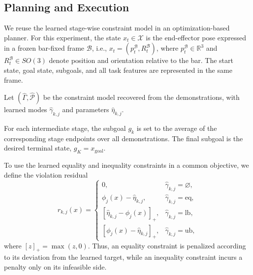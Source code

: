 

\subsection{Planning and Execution}

We reuse the learned stage-wise constraint model in an optimization-based planner. For this experiment, the state $x_t\in\mathcal{X}$ is the end-effector pose expressed in a frozen bar-fixed frame $\mathcal{B}$, i.e., $x_t=(p_t^{\mathcal{B}},R_t^{\mathcal{B}})$, where $p_t^{\mathcal{B}}\in\mathbb{R}^3$ and $R_t^{\mathcal{B}}\in SO(3)$ denote position and orientation relative to the bar. The start state, goal state, subgoals, and all task features are represented in the same frame.

Let $(\widehat{\Gamma},\widehat{\mathcal{P}})$ be the constraint model recovered from the demonstrations, with learned modes $\widehat{\gamma}_{k,j}$ and parameters $\widehat{\eta}_{k,j}$.

For each intermediate stage, the subgoal $g_k$ is set to the average of the corresponding stage endpoints over all demonstrations. The final subgoal is the desired terminal state, $g_K=x_{\mathrm{goal}}$.

To use the learned equality and inequality constraints in a common objective, we define the violation residual
\begin{equation}
r_{k,j}(x)=
\begin{cases}
0, & \widehat{\gamma}_{k,j}=\varnothing,\\
\phi_j(x)-\widehat{\eta}_{k,j}, & \widehat{\gamma}_{k,j}=\mathrm{eq},\\
\left[\widehat{\eta}_{k,j}-\phi_j(x)\right]_+, & \widehat{\gamma}_{k,j}=\mathrm{lb},\\
\left[\phi_j(x)-\widehat{\eta}_{k,j}\right]_+, & \widehat{\gamma}_{k,j}=\mathrm{ub},
\end{cases}
\label{eq:barclear_constraint_residual}
\end{equation}
where $[z]_+=\max(z,0)$. Thus, an equality constraint is penalized according to its deviation from the learned target, while an inequality constraint incurs a penalty only on its infeasible side.

